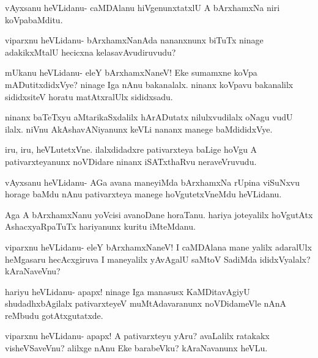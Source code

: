 \documentclass{article}
\begin{document}
\begin{mng}%
vAyxsanu heVLidanu- caMDAlanu hiVgenunxtatxlU A bArxhamxNa
niri koVpabaMditu.
\end{mng}

\begin{mng}%
viparxnu heVLidanu- bArxhamxNanAda nananxnunx biTuTx ninage adakikxMtalU 
hecicxna kelasavAvudiruvudu?
\end{mng}

\begin{mng}%
mUkanu heVLidanu- eleY bArxhamxNaneV! Eke sumamxne koVpa
mADutitxdidxVye? ninage Iga nAnu bakanalalx. ninanx koVpavu bakanalilx
sididxsiteV horatu matAtxralUlx sididxsadu.
\end{mng}

\begin{mng}%
ninanx baTeTxyu aMtarikaSxdalilx hArADutatx nilulxvudilalx oNagu
vudU ilalx. niVnu AkAshavANiyanunx keVLi nananx manege baMdididxVye.
\end{mng}

\begin{mng}%
iru, iru, heVLutetxVne. ilalxdidadxre pativarxteya baLige hoVgu
A pativarxteyanunx noVDidare ninanx iSATxthaRvu neraveVruvudu.
\end{mng}

\begin{mng}%
vAyxsanu heVLidanu- AGa avana maneyiMda bArxhamxNa rUpina
viSuNxvu horage baMdu nAnu pativarxteya manege hoVgutetxVneMdu heVLidanu.
\end{mng}

\begin{mng}%
Aga A bArxhamxNanu yoVcisi avanoDane horaTanu. hariya
joteyalilx hoVgutAtx AshacxyaRpaTuTx hariyanunx kuritu iMteMdanu.
\end{mng}

\begin{mng}%
viparxnu heVLidanu- eleY bArxhamxNaneV! I caMDAlana mane
yalilx adaralUlx heMgasaru hecAcxgiruva I maneyalilx yAvAgalU saMtoV
SadiMda ididxVyalalx? kAraNaveVnu?
\end{mng}

\begin{mng}%
hariyu heVLidanu- apapx! ninage Iga manasusx KaMDitavAgiyU 
shudadhxbAgilalx pativarxteyeV muMtAdavaranunx noVDidameVle nAnA
reMbudu gotAtxgutatxde.
\end{mng}

\begin{mng}%
viparxnu heVLidanu- apapx! A pativarxteyu yAru? avaLalilx
ratakakx visheVSaveVnu? alilxge nAnu Eke barabeVku? kAraNavanunx heVLu.
\end{mng}
\end{document}
